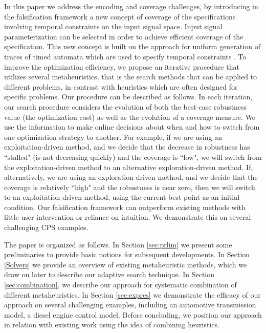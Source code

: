 In this paper we address the encoding and coverage challenges, by
introducing in the falsification framework a new concept of coverage
of the specifications involving temporal constraints on the input
signal space. Input signal parameterization can be selected in order
to achieve efficient coverage of the specification. This new concept
is built on the approach for uniform generation of traces of timed
automata which are used to specify temporal constraints
\cite{BBBK16}. To improve the optimization efficiency, we propose an
iterative procedure that utilizes several metaheuristics, that is the
search methods that can be applied to different problems, in contrast
with heuristics which are often designed for specific problems. Our
procedure can be described as follows.  In each iteration, our search
procedure considers the evolution of both the best-case robustness
value (the optimization cost) as well as the evolution of a coverage
measure.  We use the information to make online decisions about when
and how to switch from one optimization strategy to another.  For
example, if we are using an exploitation-driven method, and we decide
that the decrease in robustness has ``stalled" (is not decreasing
quickly) and the coverage is ``low", we will switch from the
exploitation-driven method to an alternative exploration-driven
method.  If, alternatively, we are using an exploration-driven method,
and we decide that the coverage is relatively ``high" and the
robustness is near zero, then we will switch to an exploitation-driven
method, using the current best point as an initial condition.  Our
falsification framework can outperform existing methods with little
user intervention or reliance on intuition. We demonstrate this on
several challenging CPS examples.

The paper is organized as follows. In Section \ref{sec:prlim} we
present some preliminaries to provide basic notions for subsequent
developments. In Section \ref{Solvers} we provide an overview of
existing metaheuristic methods, which we draw on later to describe our
adaptive search technique.  In Section \ref{sec:combination}, we
describe our approach for systematic combination of different
metaheuristics. In Section \ref{sec:expres} we demonstrate the
efficacy of our approach on several challenging examples, including an
automotive transmission model, a diesel engine control model. Before
concluding, we position our approach in relation with existing work
using the idea of combining heuristics.
